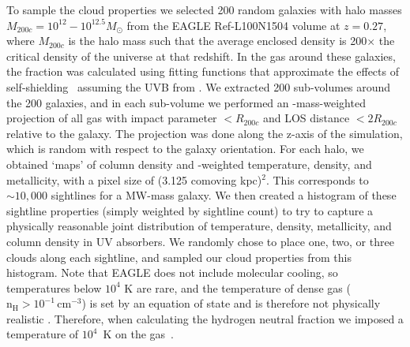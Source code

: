 \documentclass[fleqn,usenatbib]{mnras}
\begin{document}
To sample the cloud properties we selected 200 random galaxies with halo masses $M_{200c} = 10^{12} - 10^{12.5} M_\odot$ from the EAGLE Ref-L100N1504 volume at $z=0.27$, where $M_{200c}$ is the halo mass such that the average enclosed density is 200$\times$ the critical density of the universe at that redshift.
In the gas around these galaxies, the  fraction was calculated using fitting functions that approximate the effects of self-shielding~\citep{rahmati2013Impact} assuming the UVB from \citet{haardt2001Modelling}.
We extracted 200 sub-volumes around the 200 galaxies, and in each sub-volume we performed an -mass-weighted projection of all gas with impact parameter $< R_{200c}$ and LOS distance $< 2 R_{200c}$ relative to the galaxy. The projection was done along the z-axis of the simulation, which is random with respect to the galaxy orientation.
For each halo, we obtained  `maps' of  column density and -weighted temperature, density, and metallicity, with a pixel size of (3.125 comoving kpc)$^2$.
This corresponds to $\sim 10,000$ sightlines for a MW-mass galaxy.
We then created a histogram of these sightline properties (simply weighted by sightline count) to try to capture a physically reasonable joint distribution of temperature, density, metallicity, and  column density in UV absorbers.
We randomly chose to place one, two, or three clouds along each sightline, and sampled our cloud properties from this histogram.
Note that EAGLE does not include molecular cooling, so temperatures below $10^4$ K are rare, and the temperature of dense gas ($\mathrm{n}_{\mathrm{H}} > 10^{-1} \, \mathrm{cm}^{-3}$) is set by an equation of state and is therefore not physically realistic \citep{schaye2015EAGLE}.
Therefore, when calculating the hydrogen neutral fraction we imposed a temperature of $10^4$~K on the gas~\citep[following e.g.,][]{Rahmati2016}.
\end{document}
